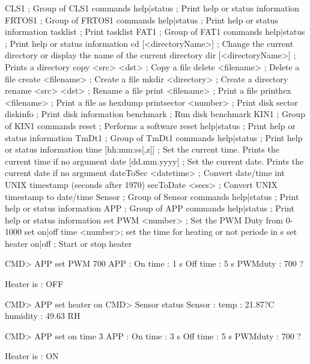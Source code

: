 CLS1                      ; Group of CLS1 commands
  help|status             ; Print help or status information
FRTOS1                    ; Group of FRTOS1 commands
  help|status             ; Print help or status information
  tasklist                ; Print tasklist
FAT1                      ; Group of FAT1 commands
  help|status             ; Print help or status information
  cd [<directoryName>]    ; Change the current directory or display the name of the current directory
  dir [<directoryName>]   ; Prints a directory
  copy <src> <dst>        ; Copy a file
  delete <filename>       ; Delete a file
  create <filename>       ; Create a file
  mkdir <directory>       ; Create a directory
  rename <src> <dst>      ; Rename a file
  print <filename>        ; Print a file
  printhex <filename>     ; Print a file as hexdump
  printsector <number>    ; Print disk sector
  diskinfo                ; Print disk information
  benchmark               ; Run disk benchmark
KIN1                      ; Group of KIN1 commands
  reset                   ; Performs a software reset
  help|status             ; Print help or status information
TmDt1                     ; Group of TmDt1 commands
  help|status             ; Print help or status information
  time [hh:mm:ss[,z]]     ; Set the current time. Prints the current time if no argument
  date [dd.mm.yyyy]       ; Set the current date. Prints the current date if no argument
  dateToSec <datetime>    ; Convert date/time int UNIX timestamp (seconds after 1970)
  secToDate <secs>        ; Convert UNIX timestamp to date/time
Sensor                    ; Group of Sensor commands
  help|status             ; Print help or status information
APP                       ; Group of APP commands
  help|status             ; Print help or status information
  set PWM <number>        ; Set the PWM Duty from 0-1000
  set on|off time <number>; set the time for heating or not periode in s
  set heater on|off       ; Start or stop heater

CMD> APP set PWM 700
APP          : 
  On time    : 1 s
  Off time   : 5 s
  PWMduty    : 700 ?

  Heater is  : OFF

CMD> APP set heater on
CMD> Sensor status
Sensor       : 
  temp       : 21.87?C
  humidity   : 49.63 RH
	
CMD> APP set on time 3
APP          : 
  On time    : 3 s
  Off time   : 5 s
  PWMduty    : 700 ?

  Heater is  : ON


	
	


